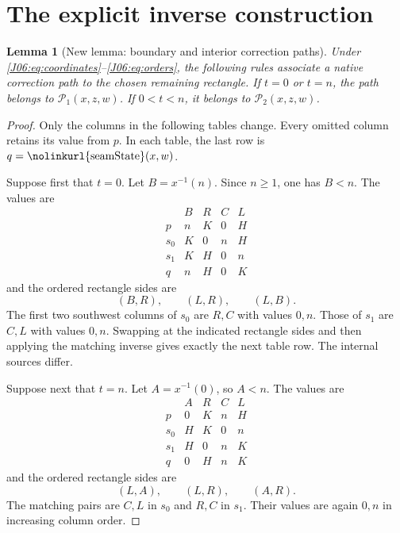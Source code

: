 \documentclass[11pt,oneside]{report}
\newtheorem{lemma}[theorem]{Lemma}
\theoremstyle{definition}
\numberwithin{equation}{section}
\newcommand{\decl}[1]{\textnormal{\nolinkurl{#1}}}
\newcommand{\cP}{\mathcal P}
\begin{document}
\section{The explicit inverse construction}

\begin{lemma}[New lemma: boundary and interior correction paths]
\label{J06:lem:construction}
Under \eqref{J06:eq:coordinates}--\eqref{J06:eq:orders}, the following rules
associate a native correction path to the chosen remaining rectangle.
If $t=0$ or $t=n$, the path belongs to $\cP_1(x,z,w)$.
If $0<t<n$, it belongs to $\cP_2(x,z,w)$.
\end{lemma}

\begin{proof}
Only the columns in the following tables change. Every omitted column
retains its value from $p$. In each table, the last row is
$q=\decl{seamState}(x,w)$.

Suppose first that $t=0$. Let $B=x^{-1}(n)$. Since $n\ge1$, one has
$B<n$. The values are
\[
\begin{array}{c|rrrr}
 &B&R&C&L\\\hline
 p   &n&K&0&H\\
 s_0 &K&0&n&H\\
 s_1 &K&H&0&n\\
 q   &n&H&0&K
\end{array}
\]
and the ordered rectangle sides are
\begin{equation}\label{J06:eq:zero-path}
 (B,R),\qquad (L,R),\qquad (L,B).
\end{equation}
The first two southwest columns of $s_0$ are $R,C$ with values $0,n$.
Those of $s_1$ are $C,L$ with values $0,n$.
Swapping at the indicated rectangle sides and then applying the matching
inverse gives exactly the next table row. The internal sources differ.

Suppose next that $t=n$. Let $A=x^{-1}(0)$, so $A<n$. The values are
\[
\begin{array}{c|rrrr}
 &A&R&C&L\\\hline
 p   &0&K&n&H\\
 s_0 &H&K&0&n\\
 s_1 &H&0&n&K\\
 q   &0&H&n&K
\end{array}
\]
and the ordered rectangle sides are
\begin{equation}\label{J06:eq:last-path}
 (L,A),\qquad (L,R),\qquad (A,R).
\end{equation}
The matching pairs are $C,L$ in $s_0$ and $R,C$ in $s_1$.
Their values are again $0,n$ in increasing column order.


\end{proof}
\end{document}
